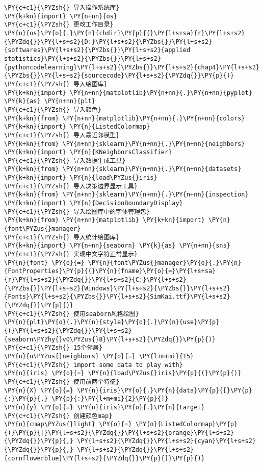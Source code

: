\begin{Verbatim}[commandchars=\\\{\}]
\PY{c+c1}{\PYZsh{} 导入操作系统库}
\PY{k+kn}{import} \PY{n+nn}{os}
\PY{c+c1}{\PYZsh{} 更改工作目录}
\PY{n}{os}\PY{o}{.}\PY{n}{chdir}\PY{p}{(}\PY{l+s+sa}{r}\PY{l+s+s2}{\PYZdq{}}\PY{l+s+s2}{D:}\PY{l+s+s2}{\PYZbs{}}\PY{l+s+s2}{softwares}\PY{l+s+s2}{\PYZbs{}}\PY{l+s+s2}{applied statistics}\PY{l+s+s2}{\PYZbs{}}\PY{l+s+s2}{pythoncodelearning}\PY{l+s+s2}{\PYZbs{}}\PY{l+s+s2}{chap4}\PY{l+s+s2}{\PYZbs{}}\PY{l+s+s2}{sourcecode}\PY{l+s+s2}{\PYZdq{}}\PY{p}{)}
\PY{c+c1}{\PYZsh{} 导入绘图库}
\PY{k+kn}{import} \PY{n+nn}{matplotlib}\PY{n+nn}{.}\PY{n+nn}{pyplot} \PY{k}{as} \PY{n+nn}{plt}
\PY{c+c1}{\PYZsh{} 导入颜色}
\PY{k+kn}{from} \PY{n+nn}{matplotlib}\PY{n+nn}{.}\PY{n+nn}{colors} \PY{k+kn}{import} \PY{n}{ListedColormap}
\PY{c+c1}{\PYZsh{} 导入最近邻模型}
\PY{k+kn}{from} \PY{n+nn}{sklearn}\PY{n+nn}{.}\PY{n+nn}{neighbors} \PY{k+kn}{import} \PY{n}{KNeighborsClassifier}
\PY{c+c1}{\PYZsh{} 导入数据生成工具}
\PY{k+kn}{from} \PY{n+nn}{sklearn}\PY{n+nn}{.}\PY{n+nn}{datasets} \PY{k+kn}{import} \PY{n}{load\PYZus{}iris}
\PY{c+c1}{\PYZsh{} 导入决策边界显示工具}
\PY{k+kn}{from} \PY{n+nn}{sklearn}\PY{n+nn}{.}\PY{n+nn}{inspection} \PY{k+kn}{import} \PY{n}{DecisionBoundaryDisplay}
\PY{c+c1}{\PYZsh{} 导入绘图库中的字体管理包}
\PY{k+kn}{from} \PY{n+nn}{matplotlib} \PY{k+kn}{import} \PY{n}{font\PYZus{}manager}
\PY{c+c1}{\PYZsh{} 导入统计绘图库}
\PY{k+kn}{import} \PY{n+nn}{seaborn} \PY{k}{as} \PY{n+nn}{sns}
\PY{c+c1}{\PYZsh{} 实现中文字符正常显示}
\PY{n}{font} \PY{o}{=} \PY{n}{font\PYZus{}manager}\PY{o}{.}\PY{n}{FontProperties}\PY{p}{(}\PY{n}{fname}\PY{o}{=}\PY{l+s+sa}{r}\PY{l+s+s2}{\PYZdq{}}\PY{l+s+s2}{C:}\PY{l+s+s2}{\PYZbs{}}\PY{l+s+s2}{Windows}\PY{l+s+s2}{\PYZbs{}}\PY{l+s+s2}{Fonts}\PY{l+s+s2}{\PYZbs{}}\PY{l+s+s2}{SimKai.ttf}\PY{l+s+s2}{\PYZdq{}}\PY{p}{)}
\PY{c+c1}{\PYZsh{} 使用seaborn风格绘图}
\PY{n}{plt}\PY{o}{.}\PY{n}{style}\PY{o}{.}\PY{n}{use}\PY{p}{(}\PY{l+s+s2}{\PYZdq{}}\PY{l+s+s2}{seaborn\PYZhy{}v0\PYZus{}8}\PY{l+s+s2}{\PYZdq{}}\PY{p}{)}
\PY{c+c1}{\PYZsh{} 15个邻居}
\PY{n}{n\PYZus{}neighbors} \PY{o}{=} \PY{l+m+mi}{15}
\PY{c+c1}{\PYZsh{} import some data to play with}
\PY{n}{iris} \PY{o}{=} \PY{n}{load\PYZus{}iris}\PY{p}{(}\PY{p}{)}
\PY{c+c1}{\PYZsh{} 使用前两个特征}
\PY{n}{X} \PY{o}{=} \PY{n}{iris}\PY{o}{.}\PY{n}{data}\PY{p}{[}\PY{p}{:}\PY{p}{,} \PY{p}{:}\PY{l+m+mi}{2}\PY{p}{]}
\PY{n}{y} \PY{o}{=} \PY{n}{iris}\PY{o}{.}\PY{n}{target}
\PY{c+c1}{\PYZsh{} 创建颜色map}
\PY{n}{cmap\PYZus{}light} \PY{o}{=} \PY{n}{ListedColormap}\PY{p}{(}\PY{p}{[}\PY{l+s+s2}{\PYZdq{}}\PY{l+s+s2}{orange}\PY{l+s+s2}{\PYZdq{}}\PY{p}{,} \PY{l+s+s2}{\PYZdq{}}\PY{l+s+s2}{cyan}\PY{l+s+s2}{\PYZdq{}}\PY{p}{,} \PY{l+s+s2}{\PYZdq{}}\PY{l+s+s2}{cornflowerblue}\PY{l+s+s2}{\PYZdq{}}\PY{p}{]}\PY{p}{)}

\end{Verbatim}
